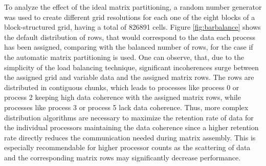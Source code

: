 To analyze the effect of the ideal matrix partitioning, a random number generator was used to create different grid resolutions for each one of the eight blocks of a block-structured grid, having a total of 826891 cells. Figure \ref{fig:barbalance} shows the default distribution of rows, that would correspond to the data each process has been assigned, comparing with the balanced number of rows, for the case if the automatic matrix partitioning is used. One can observe, that, due to the simplicity of the load balancing technique, significant incoherences surge between the assigned grid and variable data and the assigned matrix rows. The rows are distributed in contiguous chunks, which leads to processes like process 0 or process 2 keeping high data coherence with the assigned matrix rows, while processes like process 3 or process 5 lack data coherence. Thus, more complex distribution algorithms are necessary to maximize the retention rate of data for the individual processors maintaining the data coherence since a higher retention rate directly reduces the communication needed during matrix assembly. This is especially recommendable for higher processor counts as the scattering of data and the corresponding matrix rows may significantly decrease performance.

